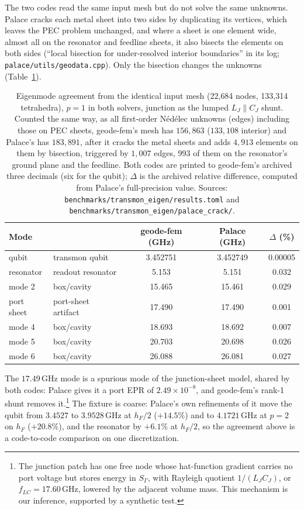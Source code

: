\documentclass{anvil-paper}
\begin{document}
The two codes read the same input mesh but do not solve the same unknowns.
Palace cracks each metal sheet into two sides by duplicating its vertices,
which leaves the PEC problem unchanged, and where a sheet is one element
wide, almost all on the resonator and feedline sheets, it also bisects the
elements on both sides (``local bisection for under-resolved interior
boundaries'' in its log; \texttt{palace/utils/geodata.cpp}). Only the
bisection changes the unknowns (Table~\ref{tab:agreement}).

\begin{table}[htbp]
  \centering
  \caption{Eigenmode agreement from the identical input mesh (22{,}684
  nodes, 133{,}314 tetrahedra), $p = 1$ in both solvers, junction as
  the lumped $L_J \parallel C_J$ shunt. Counted the same way, as all
  first-order N\'ed\'elec unknowns (edges) including those on PEC sheets,
  geode-fem's mesh has $156{,}863$ ($133{,}108$ interior) and Palace's has
  $183{,}891$, after it cracks the metal sheets and adds $4{,}913$ elements
  on them by bisection, triggered by $1{,}007$ edges, $993$ of them on
  the resonator's ground plane and the feedline. Both
  codes are printed to geode-fem's archived three decimals (six for the
  qubit); $\Delta$ is the archived relative difference, computed from
  Palace's full-precision value. Sources:
  \texttt{benchmarks/transmon\_eigen/results.toml} and
  \texttt{benchmarks/transmon\_eigen/palace\_crack/}.}
  \label{tab:agreement}
  \footnotesize
  \begin{tabular}{@{}llccc@{}}
    \toprule
    Mode & & geode-fem (GHz) & Palace (GHz) & $\Delta$ (\%) \\
    \midrule
    qubit & transmon qubit & 3.452751 & 3.452749 & 0.00005 \\
    resonator & readout resonator & 5.153 & 5.151 & 0.032 \\
    mode 2 & box/cavity & 15.465 & 15.461 & 0.029 \\
    port sheet & port-sheet artifact & 17.490 & 17.490 & 0.001 \\
    mode 4 & box/cavity & 18.693 & 18.692 & 0.007 \\
    mode 5 & box/cavity & 20.703 & 20.698 & 0.026 \\
    mode 6 & box/cavity & 26.088 & 26.081 & 0.027 \\
    \bottomrule
  \end{tabular}
\end{table}

The $17.49$\,GHz mode is a spurious mode of the junction-sheet model,
shared by both codes: Palace gives it a port EPR of $2.49\times10^{-8}$,
and geode-fem's rank-1 shunt removes it.\footnote{The junction patch has
one free node whose hat-function gradient carries no port voltage but
stores energy in $S_\Gamma$, with Rayleigh quotient $1/(L_JC_J)$, or
$f_{LC} = 17.60$\,GHz, lowered by the adjacent volume mass. This
mechanism is our inference, supported by a synthetic test.} The fixture
is coarse: Palace's own refinements of it move the qubit from
$3.4527$ to $3.9528$\,GHz at $h_F/2$ ($+14.5\%$) and to $4.1721$\,GHz at
$p = 2$ on $h_F$ ($+20.8\%$), and the resonator by $+6.1\%$ at $h_F/2$, so
the agreement above is a code-to-code comparison on one discretization.
\end{document}
